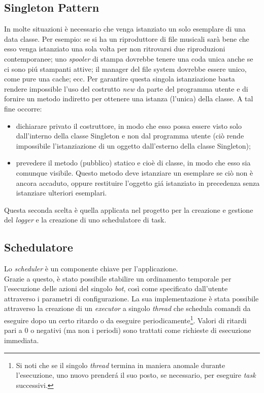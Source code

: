 \vspace*{0.5cm}
\subsection{Singleton Pattern}
In molte situazioni \`e necessario che venga istanziato un solo esemplare di una data classe. Per esempio: se si ha un riproduttore di file musicali sar\`a bene che esso venga istanziato una sola volta per non ritrovarsi due riproduzioni contemporanee; uno \textit{spooler} di stampa dovrebbe tenere una coda unica anche se ci sono pi\'u
stampanti attive; il manager del file system dovrebbe essere unico, come pure una cache; ecc. Per garantire questa singola istanziazione basta rendere impossible l'uso del costrutto \textit{new} da parte del programma utente e di fornire un metodo indiretto per ottenere una istanza (l'unica) della classe.
A tal fine occorre:
\begin{itemize}
\item dichiarare privato il costruttore, in modo che esso possa essere visto solo dall'interno della classe Singleton e non dal programma utente (ci\`o rende impossibile l'istanziazione di un oggetto dall'esterno della classe Singleton);
\item prevedere il metodo (pubblico) statico e cio\`e di classe, in modo che esso sia comunque visibile. Questo metodo deve istanziare un esemplare se ci\`o non \`e ancora accaduto, oppure restituire l'oggetto gi\'a istanziato in precedenza senza istanziare ulteriori esemplari.
\end{itemize}
Questa seconda scelta \`e quella applicata nel progetto per la creazione e gestione del \textit{logger} e la creazione di uno schedulatore di task.

\vspace*{0.5cm}
\subsection{Schedulatore}
Lo \textit{scheduler} \`e un componente chiave per l'applicazione. \\
Grazie a questo, \`e stato possibile stabilire un ordinamento temporale per l'esecuzione delle azioni del singolo \textit{bot}, cos\`i come specificato dall'utente attraverso i parametri di configurazione. La sua implementazione \`e stata possibile attraverso la creazione di un \textit{executor} a singolo \textit{thread} che schedula comandi da eseguire dopo un certo ritardo o da eseguire periodicamente\footnote{Si noti che se il singolo \textit{thread} termina in maniera anomale durante l'esecuzione, uno nuovo prender\'a il suo posto, se necessario, per eseguire \textit{task} successivi.}. Valori di ritardi pari a 0 o negativi (ma non i periodi) sono trattati come richieste di esecuzione immediata. 

